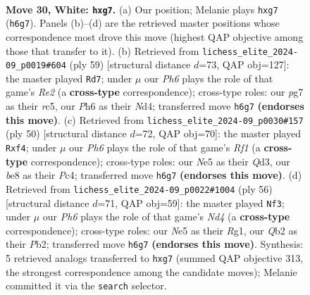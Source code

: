\documentclass[11pt]{article}
\begin{document}
\clearpage

\begin{figure}[p]\centering
\begin{subfigure}{0.46\textwidth}\centering
\resizebox{\linewidth}{!}{%
\newchessgame
\chessboard[
  setfen={r3b1k1/pr3pp1/7P/p3N3/4p2q/PP6/1Q3P2/R3R1K1 w - - 0 30},
  showmover=false,
  pgfstyle=straightmove, color=movearrow, markmove={h6-g7}
]}
\caption{}
\end{subfigure}\hfill
\begin{subfigure}{0.46\textwidth}\centering
\resizebox{\linewidth}{!}{%
\newchessgame
\chessboard[
  setfen={3q1r1k/4r2p/2p2p2/ppR1PP2/3n3Q/P2P3B/7P/5R1K b - - 2 30},
  showmover=false,
  pgfstyle=straightmove, color=movearrow, markmove={e7-d7}
]}
\caption{}
\end{subfigure}
\\[4pt]
\begin{subfigure}{0.46\textwidth}\centering
\resizebox{\linewidth}{!}{%
\newchessgame
\chessboard[
  setfen={2k4r/pbpp4/1p6/3P2qp/P1P2p2/3Q2P1/1P6/R4RK1 w - - 0 26},
  showmover=false,
  pgfstyle=straightmove, color=movearrow, markmove={f1-f4}
]}
\caption{}
\end{subfigure}\hfill
\begin{subfigure}{0.46\textwidth}\centering
\resizebox{\linewidth}{!}{%
\newchessgame
\chessboard[
  setfen={7r/3b1k2/4pPp1/p1rp4/1p1N3q/8/PPPQ4/2K2RR1 w - - 1 29},
  showmover=false,
  pgfstyle=straightmove, color=movearrow, markmove={d4-f3}
]}
\caption{}
\end{subfigure}
\caption{\textbf{Move 30, White: \texttt{hxg7}.} (a) Our position; Melanie plays \texttt{hxg7} (\texttt{h6g7}). Panels (b)--(d) are the retrieved master positions whose correspondence most drove this move (highest QAP objective among those that transfer to it). (b) Retrieved from \texttt{lichess\_elite\_2024-09\_p0019\#604} (ply 59) [structural distance $d$=73, QAP obj=127]: the master played \texttt{Rd7}; under $\mu$ our \emph{Ph6} plays the role of that game's \emph{Re2} (a \textbf{cross-type} correspondence); cross-type roles: our \emph{p}g7 as their \emph{r}c5, our \emph{P}h6 as their \emph{N}d4; transferred move \texttt{h6g7} \textbf{(endorses this move)}. (c) Retrieved from \texttt{lichess\_elite\_2024-09\_p0030\#157} (ply 50) [structural distance $d$=72, QAP obj=70]: the master played \texttt{Rxf4}; under $\mu$ our \emph{Ph6} plays the role of that game's \emph{Rf1} (a \textbf{cross-type} correspondence); cross-type roles: our \emph{N}e5 as their \emph{Q}d3, our \emph{b}e8 as their \emph{P}c4; transferred move \texttt{h6g7} \textbf{(endorses this move)}. (d) Retrieved from \texttt{lichess\_elite\_2024-09\_p0022\#1004} (ply 56) [structural distance $d$=71, QAP obj=59]: the master played \texttt{Nf3}; under $\mu$ our \emph{Ph6} plays the role of that game's \emph{Nd4} (a \textbf{cross-type} correspondence); cross-type roles: our \emph{N}e5 as their \emph{R}g1, our \emph{Q}b2 as their \emph{P}b2; transferred move \texttt{h6g7} \textbf{(endorses this move)}. Synthesis: 5 retrieved analogs transferred to \texttt{hxg7} (summed QAP objective 313, the strongest correspondence among the candidate moves); Melanie committed it via the \texttt{search} selector.}
\label{fig:thought-m58}
\end{figure}
\end{document}
